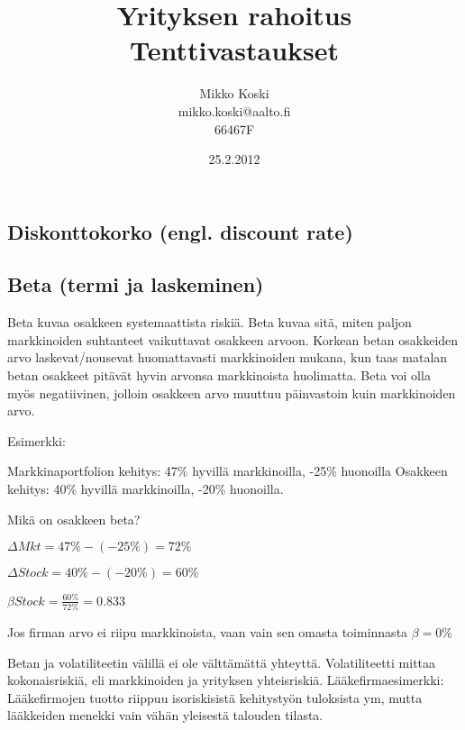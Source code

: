 \documentclass[a4paper]{article}
\begin{document}
\title{\small Yrityksen rahoitus \\ \huge Tenttivastaukset}
\date{25.2.2012}
\author{Mikko Koski \\ mikko.koski@aalto.fi \\ 66467F}
\maketitle

\normalsize
\setlength{\parindent}{0cm}

\usepackage{parskip}
\setlength{\parskip}{0.5em}


\subsection{Diskonttokorko (engl. discount rate)}



\subsection{Beta (termi ja laskeminen)}

Beta kuvaa osakkeen systemaattista riskiä. Beta kuvaa sitä, miten paljon markkinoiden suhtanteet vaikuttavat osakkeen arvoon. Korkean betan osakkeiden arvo laskevat/nousevat huomattavasti markkinoiden mukana, kun taas matalan betan osakkeet pitävät hyvin arvonsa markkinoista huolimatta. Beta voi olla myös negatiivinen, jolloin osakkeen arvo muuttuu päinvastoin kuin markkinoiden arvo.

Esimerkki:

Markkinaportfolion kehitys: 47\% hyvillä markkinoilla, -25\% huonoilla
Osakkeen kehitys: 40\% hyvillä markkinoilla, -20\% huonoilla.

Mikä on osakkeen beta?

$\Delta Mkt = 47\% - (-25\%) = 72\% $

$\Delta Stock = 40\% - (-20\%) = 60\%$

$\beta Stock = \frac{60\%}{72\%} = 0.833 $

Jos firman arvo ei riipu markkinoista, vaan vain sen omasta toiminnasta $\beta = 0\%$

Betan ja volatiliteetin välillä ei ole välttämättä yhteyttä. Volatiliteetti mittaa kokonaisriskiä, eli markkinoiden ja yrityksen yhteisriskiä. Lääkefirmaesimerkki: Lääkefirmojen tuotto riippuu isoriskisistä kehitystyön tuloksista ym, mutta lääkkeiden menekki vain vähän yleisestä talouden tilasta.
\end{document}
